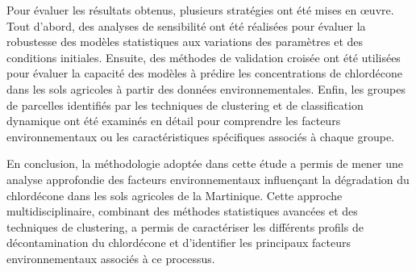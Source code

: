 \documentclass{report}
\begin{document}
Pour évaluer les résultats obtenus, plusieurs stratégies ont été mises en œuvre. Tout d'abord, des analyses de sensibilité ont été réalisées pour évaluer la robustesse des modèles statistiques aux variations des paramètres et des conditions initiales. Ensuite, des méthodes de validation croisée ont été utilisées pour évaluer la capacité des modèles à prédire les concentrations de chlordécone dans les sols agricoles à partir des données environnementales. Enfin, les groupes de parcelles identifiés par les techniques de clustering et de classification dynamique ont été examinés en détail pour comprendre les facteurs environnementaux ou les caractéristiques spécifiques associés à chaque groupe.

En conclusion, la méthodologie adoptée dans cette étude a permis de mener une analyse approfondie des facteurs environnementaux influençant la dégradation du chlordécone dans les sols agricoles de la Martinique. Cette approche multidisciplinaire, combinant des méthodes statistiques avancées et des techniques de clustering, a permis de caractériser les différents profils de décontamination du chlordécone et d'identifier les principaux facteurs environnementaux associés à ce processus.
\end{document}
